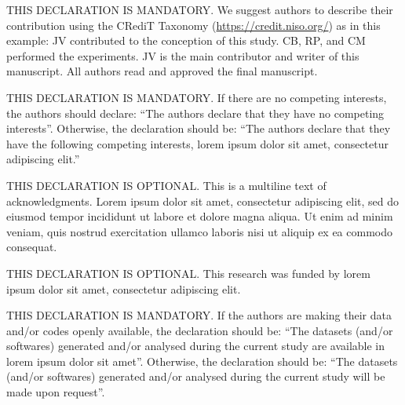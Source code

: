 \documentclass{sbc2023}%
\begin{document}
\begin{contributions}
THIS DECLARATION IS MANDATORY. We suggest authors to describe their contribution using the CRediT Taxonomy (\href{https://credit.niso.org/}{https://credit.niso.org/}) as in this example: JV contributed to the conception of this study. CB, RP, and CM performed the experiments. JV is the main contributor and writer of this manuscript. All authors read and approved the final manuscript. 
\end{contributions}

\begin{interests}
THIS DECLARATION IS MANDATORY. If there are no competing interests, the authors should declare: ``The authors declare that they have no competing interests''. Otherwise, the declaration should be: ``The authors declare that they have the following competing interests, lorem ipsum dolor sit amet, consectetur adipiscing elit.''
\end{interests}

\begin{acknowledgements}
THIS DECLARATION IS OPTIONAL. This is a multiline text of acknowledgments. Lorem ipsum dolor sit amet, consectetur adipiscing elit, sed do eiusmod tempor incididunt ut labore et dolore magna aliqua. Ut enim ad minim veniam, quis nostrud exercitation ullamco laboris nisi ut aliquip ex ea commodo consequat.
\end{acknowledgements}

\begin{funding}
THIS DECLARATION IS OPTIONAL. This research was funded by lorem ipsum dolor sit amet, consectetur adipiscing elit.
\end{funding}

\begin{materials}
THIS DECLARATION IS MANDATORY. If the authors are making their data and/or codes openly available, the declaration should be: ``The datasets (and/or softwares) generated and/or analysed during the current study are available in lorem ipsum dolor sit amet''. Otherwise, the declaration should be: ``The datasets (and/or softwares) generated and/or analysed during the current study will be made upon request''.
\end{materials}




\end{document}
